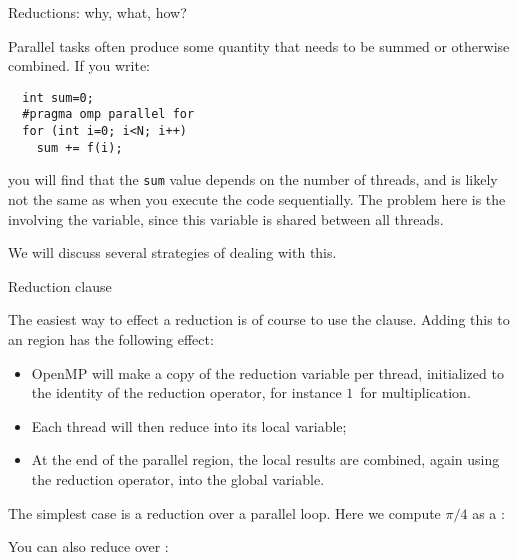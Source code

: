 
\label{sec:reduction}

 {Reductions: why, what, how?}

Parallel tasks often produce some quantity that needs to be summed
or otherwise combined.
If you write:
\begin{lstlisting}
  int sum=0;
  #pragma omp parallel for
  for (int i=0; i<N; i++)
    sum += f(i);
\end{lstlisting}
you will find that the \lstinline{sum} value depends on the number of threads,
and is likely not the same as when you execute the code sequentially.
The problem here is the  involving the 
variable, since this variable is shared between all threads.

We will discuss several strategies of dealing with this.

 {Reduction clause}

The easiest way to effect a reduction is of course to use the 
clause.
Adding this to an  region
has the following effect:
\begin{itemize}
\item OpenMP will make a copy of the reduction variable per thread,
  initialized to the identity of the reduction operator, for instance
  $1$~for multiplication.
\item Each thread will then reduce into its local variable;
\item At the end of the parallel region, the local results are combined, again
  using the reduction operator, into the global variable.
\end{itemize}

The simplest case is a reduction over a parallel loop.
Here we compute $\pi/4$ as a :


You can also reduce over :
%

